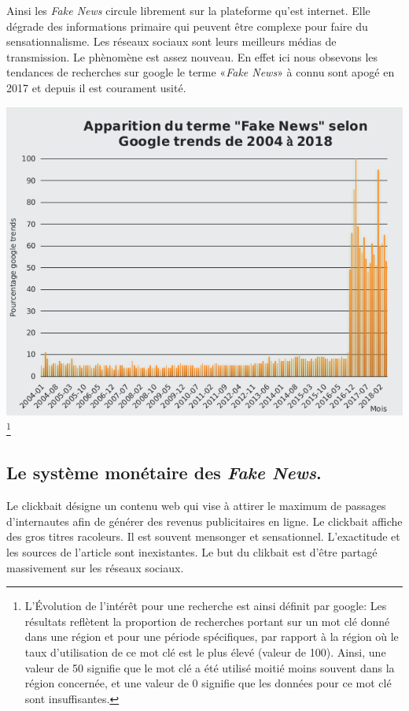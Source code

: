 \documentclass[11pt,a4paper,oldfontcommands]{memoir}
\begin{document}
Ainsi les \textit{Fake News} circule librement sur la plateforme qu'est internet.
Elle dégrade des informations primaire qui peuvent être complexe pour faire du sensationnalisme.
Les réseaux sociaux sont leurs meilleurs médias de transmission.
Le phènomène est assez nouveau.
En effet ici nous obsevons les tendances de recherches sur google le terme «\textit{Fake News}» à connu sont apogé en 2017 et depuis il est courament usité.

\begin{center}
 \includegraphics[scale=0.7]{../../img/google_trends.png}
 \footnote{L'Évolution de l'intérêt pour une recherche est ainsi définit par google:
  Les résultats reflètent la proportion de recherches portant sur un mot clé donné dans une région et pour une période spécifiques, par rapport à la région où le taux d'utilisation de ce mot clé est le plus élevé (valeur de 100). Ainsi, une valeur de 50 signifie que le mot clé a été utilisé moitié moins souvent dans la région concernée, et une valeur de 0 signifie que les données pour ce mot clé sont insuffisantes.}
 \label{google_trends}
\end{center}


\subsection{Le système monétaire des \textit{Fake News}.}


Le clickbait désigne un contenu web qui vise à attirer le maximum de passages d'internautes afin de générer des revenus publicitaires en ligne.
Le clickbait affiche des gros titres racoleurs.
Il est souvent mensonger et sensationnel.
L'exactitude et les sources de l'article sont inexistantes.
Le but du clikbait est d'être partagé massivement sur les réseaux sociaux.
\end{document}
